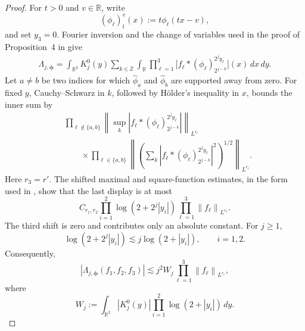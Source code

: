 \documentclass[11pt]{amsart}
\theoremstyle{remark}
\numberwithin{equation}{section}
\newcommand{\R}{\mathbb R}
\newcommand{\norm}[1]{\left\lVert #1\right\rVert}
\begin{document}
\begin{proof}
		For \(t>0\) and \(v\in\R\), write
		\[
		(\phi_\ell)_t^v(x):=t\phi_\ell(tx-v),
		\]
		and set \(y_3=0\). Fourier inversion and the change of variables used in
		the proof of Proposition~4 in \cite{dosidis_multilinear_2024} give
		\[
		\begin{aligned}
			\Lambda_{j,\boldsymbol\phi}
			=\int_{\R^2}K_j^0(y)
			\sum_{k\in\mathbb Z}\int_\R
			\prod_{\ell=1}^3
			\bigl[
			f_\ell*(\phi_\ell)_{2^{j-k}}^{2^jy_\ell}
			\bigr](x)\,dx\,dy.
		\end{aligned}
		\]
		Let \(a\ne b\) be two indices for which
		\(\widehat\phi_a\) and \(\widehat\phi_b\) are supported away from zero.
		For fixed \(y\), Cauchy--Schwarz in \(k\), followed by H\"older's
		inequality in \(x\), bounds the inner sum by
		\[
		\begin{aligned}
			&\prod_{\ell\notin\{a,b\}}
			\norm{\sup_k
				|f_\ell*(\phi_\ell)_{2^{j-k}}^{2^jy_\ell}|}_{L^{r_\ell}}
			\\
			&\qquad\times
			\prod_{\ell\in\{a,b\}}
			\norm{\left(\sum_k
				|f_\ell*(\phi_\ell)_{2^{j-k}}^{2^jy_\ell}|^2
				\right)^{1/2}}_{L^{r_\ell}}.
		\end{aligned}
		\]
		Here \(r_3=r'\). The shifted maximal and square-function estimates, in
		the form used in \cite[the proof of Proposition~4]{dosidis_multilinear_2024},
		show that the last display is at most
		\[
		C_{r_1,r_2}
		\prod_{i=1}^2\log(2+2^j|y_i|)
		\prod_{\ell=1}^3\norm{f_\ell}_{L^{r_\ell}}.
		\]
		The third shift is zero and contributes only an absolute constant. For
		\(j\ge1\),
		\[
		\log(2+2^j|y_i|)
		\lesssim j\log(2+|y_i|),
		\qquad i=1,2.
		\]
		Consequently,
		\begin{equation}\label{eq:poly-growth-reduction}
			|\Lambda_{j,\boldsymbol\phi}(f_1,f_2,f_3)|
			\lesssim
			j^2 W_j
			\prod_{\ell=1}^3\norm{f_\ell}_{L^{r_\ell}},
		\end{equation}
		where
		\[
		W_j:=\int_{\R^2}|K_j^0(y)|
		\prod_{i=1}^2\log(2+|y_i|)\,dy.
		\]
		

\end{proof}
\end{document}
